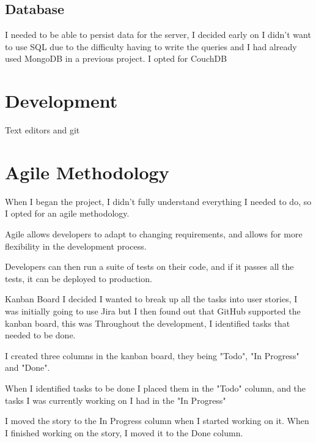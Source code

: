 \subsection{Database}
I needed to be able to persist data for the server,
I decided early on I didn't want to use SQL due to the
difficulty having to write the queries and I had already used MongoDB in a previous project.
I opted for CouchDB


\section{Development}

Text editors and git


\section{Agile Methodology}
When I began the project, I didn't fully understand everything I needed to do,
so I opted for an agile methodology.

Agile allows developers to adapt to changing requirements,
and allows for more flexibility in the development process.

Developers can then run a suite of tests on their code,
and if it passes all the tests, it can be deployed to production.

Kanban Board
I decided I wanted to break up all the tasks into user stories,
I was initially going to use Jira but I then found out that
GitHub supported the kanban board, this was
Throughout the development, I identified tasks that needed to be done.

I created three columns in the kanban board, they being "Todo", "In Progress" and "Done".

When I identified tasks to be done I placed them in the "Todo" column,
and the tasks I was currently working on I had in the "In Progress"

I moved the story to the In Progress column when I started working on it.
When I finished working on the story, I moved it to the Done column.

